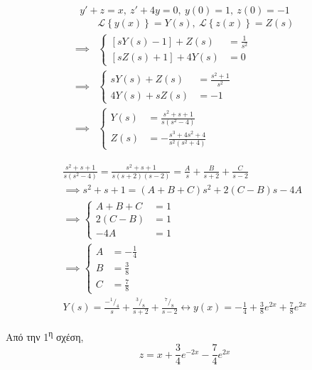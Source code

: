 \documentclass[11pt,a4paper,titlepage,final]{article}
\begin{document}
\begin{exercise*}{12.13}
	\[
	y'+z=x,\ z'+4y=0,\ y(0)=1,\ z(0)=-1
	\]
	\tcblower
	\begin{align*}
	 &\mathscr L \left\lbrace y(x) \right\rbrace = Y(s),\  \mathscr L \left\lbrace z(x) \right\rbrace = Z(s) \\
	 \implies &
	 \begin{cases}
	 \left[sY(s)-1\right]+Z(s) &= \frac{1}{s^2} \\
	 \left[sZ(s)+1\right]+4Y(s) &=0
	 \end{cases}
	 \\ \implies &
	 \begin{cases}
	 sY(s) + Z(s) &= \frac{s^2+1}{s^2} \\
	 4Y(s) + sZ(s) &= -1
	 \end{cases}
	 \\ \implies &
	 \begin{cases}
	 Y(s) &= \frac{s^2+s+1}{s(s^2-4)} \\
	 Z(s) &= -\frac{s^3+4s^2+4}{s^2(s^2+4)}
	 \end{cases}
	\end{align*}
	
	\begin{align*}
	\frac{s^2+s+1}{s(s^2-4)} = \frac{s^2+s+1}{s(s+2)(s-2)} = \frac{A}{s} + \frac{B}{s+2} + \frac{C}{s-2} \\
	\implies s^2+s+1 = (A+B+C)s^2+2(C-B)s-4A \\
	\implies \begin{cases}
	A+B+C &= 1 \\
	2(C-B) &= 1 \\
	-4A &= 1
	\end{cases} \\
	\implies \begin{cases}
	A &= - \frac{1}{4} \\
	B &= \frac{3}{8} \\
	C &= \frac{7}{8}
	\end{cases} \\
	Y(s) = \frac{- ^1/_4}{s}+\frac{^3/_8}{s+2}+\frac{^7/_8}{s-2} \leftrightarrow \boxed{y(x) = -\frac{1}{4}+\frac{3}{8}e^{2x}+\frac{7}{8}e^{2x}}
	\end{align*}
	
	Από την 1\textsuperscript{η} σχέση,
	\[
	\boxed{z = x+\frac{3}{4}e^{-2x}-\frac{7}{4}e^{2x}}
	\]
\end{exercise*}
\end{document}

